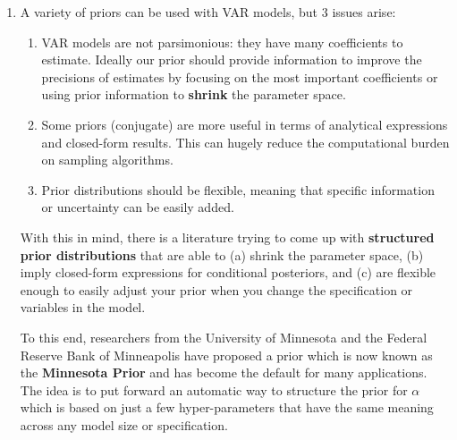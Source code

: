 \begin{enumerate}
\item
A variety of priors can be used with VAR models, but 3 issues arise:
\begin{enumerate}
\item VAR models are not parsimonious: they have many coefficients to estimate.
Ideally our prior should provide information to improve the precisions of estimates by focusing on the most important coefficients
  or using prior information to \textbf{shrink} the parameter space.
\item Some priors (conjugate) are more useful in terms of analytical expressions and closed-form results.
This can hugely reduce the computational burden on sampling algorithms.
\item Prior distributions should be flexible, meaning that specific information or uncertainty can be easily added.
\end{enumerate}
With this in mind, there is a literature trying to come up with \textbf{structured prior distributions} that are able to
(a) shrink the parameter space,
(b) imply closed-form expressions for conditional posteriors, and
(c) are flexible enough to easily adjust your prior when you change the specification or variables in the model.

To this end, researchers from the University of Minnesota and the Federal Reserve Bank of Minneapolis have proposed a prior
  which is now known as the \textbf{Minnesota Prior} and has become the default for many applications.
The idea is to put forward an automatic way to structure the prior for \(\alpha \)
  which is based on just a few hyper-parameters that have the same meaning across any model size or specification.


\end{enumerate}
